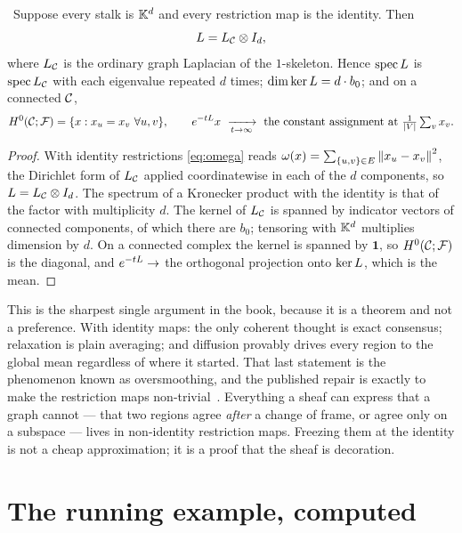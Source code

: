 \begin{proposition}
\label{prop:identityfatal}\label{prop:b0kernel}%
\Proved\ Suppose every stalk is $\mathbb{K}^{d}$ and every restriction map is the
identity. Then
\[
  L=L_{\mathcal{C}}\otimes I_d,
\]
where $L_{\mathcal{C}}$ is the ordinary graph Laplacian of the $1$-skeleton. Hence
$\operatorname{spec}L$ is $\operatorname{spec}L_{\mathcal{C}}$ with each eigenvalue
repeated $d$ times; $\dim\ker L=d\cdot b_0$; and on a connected $\mathcal{C}$,
\[
  H^{0}(\mathcal{C};\mathcal{F})=\{x: x_u=x_v \ \forall u,v\},\qquad
  e^{-tL}x\ \xrightarrow[t\to\infty]{}\ \text{the constant assignment at }
  \tfrac{1}{|V|}\textstyle\sum_v x_v .
\]
\end{proposition}
\begin{proof}
With identity restrictions \eqref{eq:omega} reads
$\omega(x)=\sum_{\{u,v\}\in E}\left\lVert x_u-x_v \right\rVert^2$, the Dirichlet form of
$L_{\mathcal{C}}$ applied coordinatewise in each of the $d$ components, so
$L=L_{\mathcal{C}}\otimes I_d$. The spectrum of a Kronecker product with the identity
is that of the factor with multiplicity $d$. The kernel of $L_{\mathcal{C}}$ is spanned
by indicator vectors of connected components, of which there are $b_0$;
tensoring with $\mathbb{K}^{d}$ multiplies dimension by $d$. On a connected complex the
kernel is spanned by $\mathbf 1$, so $H^{0}(\mathcal{C};\mathcal{F})$ is the diagonal, and
$e^{-tL}\to$ the orthogonal projection onto $\ker L$, which is the mean.
\end{proof}

\begin{hon}\Hon
This is the sharpest single argument in the book, because it is a theorem and
not a preference. With identity maps: the only coherent thought is exact
consensus; relaxation is plain averaging; and diffusion provably drives every
region to the global mean regardless of where it started. That last statement
is the phenomenon known as oversmoothing, and the published repair is exactly
to make the restriction maps non-trivial~\cite{BodnarSheaf}. Everything a
sheaf can express that a graph cannot --- that two regions agree \emph{after}
a change of frame, or agree only on a subspace --- lives in non-identity
restriction maps. Freezing them at the identity is not a cheap approximation;
it is a proof that the sheaf is decoration.
\end{hon}

\section{The running example, computed}

